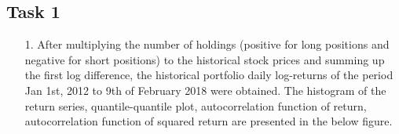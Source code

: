 \documentclass[a4paper,11pt]{article}
\begin{document}
\begin{flushleft}




\section{Task 1}
\begin{itemize}
\item[1.] After multiplying the number of holdings (positive for long positions and negative for short positions) to the historical stock prices and summing up the first log difference, the historical portfolio daily log-returns of the period Jan 1st, 2012 to 9th of February 2018 were obtained. The histogram of the return series, quantile-quantile plot, autocorrelation function of return, autocorrelation function of squared return are presented in the below figure. 



\end{itemize}
\end{flushleft}
\end{document}
